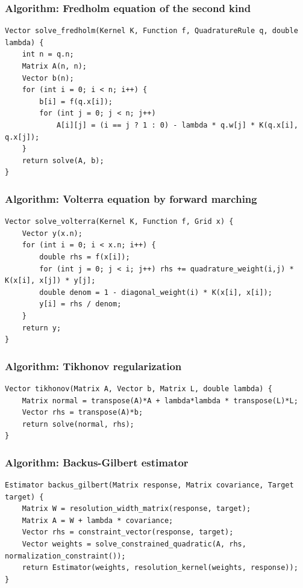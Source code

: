 \documentclass[11pt]{article}
\begin{document}
\subsubsection{Algorithm: Fredholm equation of the second kind}\label{algorithm-fredholm-equation-of-the-second-kind}

\begin{verbatim}
Vector solve_fredholm(Kernel K, Function f, QuadratureRule q, double lambda) {
    int n = q.n;
    Matrix A(n, n);
    Vector b(n);
    for (int i = 0; i < n; i++) {
        b[i] = f(q.x[i]);
        for (int j = 0; j < n; j++)
            A[i][j] = (i == j ? 1 : 0) - lambda * q.w[j] * K(q.x[i], q.x[j]);
    }
    return solve(A, b);
}
\end{verbatim}

\subsubsection{Algorithm: Volterra equation by forward marching}\label{algorithm-volterra-equation-by-forward-marching}

\begin{verbatim}
Vector solve_volterra(Kernel K, Function f, Grid x) {
    Vector y(x.n);
    for (int i = 0; i < x.n; i++) {
        double rhs = f(x[i]);
        for (int j = 0; j < i; j++) rhs += quadrature_weight(i,j) * K(x[i], x[j]) * y[j];
        double denom = 1 - diagonal_weight(i) * K(x[i], x[i]);
        y[i] = rhs / denom;
    }
    return y;
}
\end{verbatim}

\subsubsection{Algorithm: Tikhonov regularization}\label{algorithm-tikhonov-regularization}

\begin{verbatim}
Vector tikhonov(Matrix A, Vector b, Matrix L, double lambda) {
    Matrix normal = transpose(A)*A + lambda*lambda * transpose(L)*L;
    Vector rhs = transpose(A)*b;
    return solve(normal, rhs);
}
\end{verbatim}

\subsubsection{Algorithm: Backus-Gilbert estimator}\label{algorithm-backus-gilbert-estimator}

\begin{verbatim}
Estimator backus_gilbert(Matrix response, Matrix covariance, Target target) {
    Matrix W = resolution_width_matrix(response, target);
    Matrix A = W + lambda * covariance;
    Vector rhs = constraint_vector(response, target);
    Vector weights = solve_constrained_quadratic(A, rhs, normalization_constraint());
    return Estimator(weights, resolution_kernel(weights, response));
}
\end{verbatim}
\end{document}
